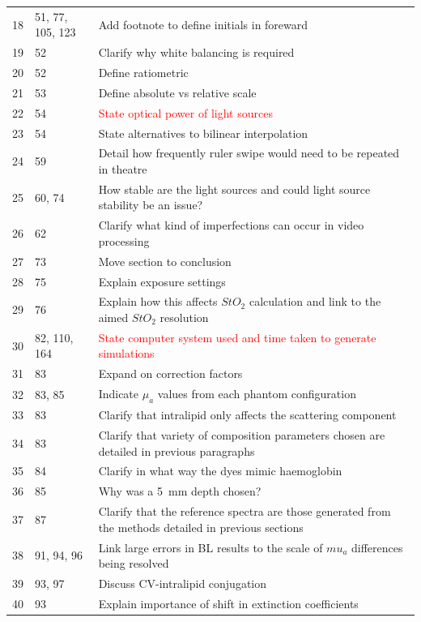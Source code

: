 \documentclass{article}
\begin{document}
\begin{table}
\begin{tabular}{|p{1.5cm}|p{2cm}|p{7.5cm}|}
        18 & 51, 77, 105, 123 & Add footnote to define initials in foreward \\
        19 & 52 & Clarify why white balancing is required \\
        20 & 52 & Define ratiometric \\
        21 & 53 & Define absolute vs relative scale \\
        22 & 54 & \textcolor{red}{State optical power of light sources} \\
        23 & 54 & State alternatives to bilinear interpolation \\
        24 & 59 & Detail how frequently ruler swipe would need to be repeated in theatre \\
        25 & 60, 74 & How stable are the light sources and could light source stability be an issue? \\
        26 & 62 & Clarify what kind of imperfections can occur in video processing \\
        27 & 73 & Move section to conclusion \\
        28 & 75 & Explain exposure settings \\
        29 & 76 & Explain how this affects $StO_2$ calculation and link to the aimed $StO_2$ resolution \\
        30 & 82, 110, 164 & \textcolor{red}{State computer system used and time taken to generate simulations} \\
        31 & 83 & Expand on correction factors \\
        32 & 83, 85 & Indicate $\mu_a$ values from each phantom configuration \\
        33 & 83 & Clarify that intralipid only affects the scattering component \\
        34 & 83 & Clarify that variety of composition parameters chosen are detailed in previous paragraphs \\
        35 & 84 & Clarify in what way the dyes mimic haemoglobin \\
        36 & 85 & Why was a 5~mm depth chosen? \\
        37 & 87 & Clarify that the reference spectra are those generated from the methods detailed in previous sections \\
        38 & 91, 94, 96 & Link large errors in BL results to the scale of $mu_a$ differences being resolved \\
        39 & 93, 97 & Discuss CV-intralipid conjugation \\
        40 & 93 & Explain importance of shift in extinction coefficients \\

\end{tabular}
\end{table}
\end{document}
